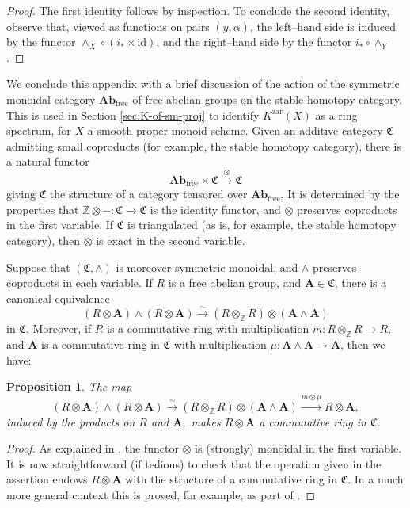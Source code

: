 \documentclass[12pt]{amsart}
\def\Kzar{K^{\mathrm{zar}}}
\newcommand{\Z}{\mathbb{Z}}
\numberwithin{equation}{section}
\theoremstyle{plain}
\newtheorem{prop}[equation]{Proposition}
\theoremstyle{definition}
\theoremstyle{remark}
\begin{document}
\begin{proof}
The first identity follows by inspection. To conclude the second
identity, observe that, viewed as functions on pairs $(y,\alpha)$, the
left--hand side is induced by the functor $\wedge_X\circ
(i_*\times\mathrm{id})$, and the right--hand side by the functor $i_*
\circ \wedge_Y$.
\end{proof}

We conclude this appendix with a brief discussion of the action of the
symmetric monoidal category $\mathbf{Ab}_{\mathrm{free}}$ of free abelian groups on the stable
homotopy category. This is used in Section \ref{sec:K-of-sm-proj} to identify
$\Kzar(X)$ as a ring spectrum, for $X$ a smooth proper monoid
scheme. Given an additive category
$\mathfrak{C}$ admitting small coproducts (for example, the stable
homotopy category), there is a natural functor
\[
\mathbf{Ab}_{\mathrm{free}}\times \mathfrak{C}
\xrightarrow{\otimes} \mathfrak{C}
\]
 giving $\mathfrak{C}$ the structure of a category tensored over
 $\mathbf{Ab}_{\mathrm{free}}$. It is determined by the properties
 that $\Z\otimes -: \mathfrak{C}\to\mathfrak{C}$ is the identity
 functor, and $\otimes$ preserves coproducts in the first variable. If
 $\mathfrak{C}$ is triangulated (as is, for example, the stable
 homotopy category), then $\otimes$ is exact in the second variable.
 
Suppose that $(\mathfrak{C},\wedge)$ is moreover symmetric monoidal,
 and $\wedge$ preserves coproducts in each variable. If $R$ is a free
 abelian group, and $\mathbf{A}\in \mathfrak{C}$, there is a canonical
 equivalence
 \[
 (R\otimes\mathbf{A})\wedge (R\otimes\mathbf{A})\xrightarrow{\sim} (R\otimes_\Z R)\otimes (\mathbf{A}\wedge\mathbf{A})
 \]
in $\mathfrak{C}$. Moreover, if $R$ is a commutative ring with
multiplication $m:R\otimes_\Z R\to R$, and $\mathbf{A}$ is a
commutative ring in $\mathfrak{C}$ with multiplication
$\mu:\mathbf{A}\wedge\mathbf{A}\to\mathbf{A}$, then we have:
 
 \begin{prop}\label{prop:algebras}
 	 The map
 	\[ (R\otimes\mathbf{A})\wedge (R\otimes\mathbf{A})\xrightarrow{\sim} (R\otimes_\Z R)\otimes (\mathbf{A}\wedge\mathbf{A})\xrightarrow{m\otimes\mu} R\otimes\mathbf{A},\]
 	induced by the products on $R$ and $\mathbf{A},$
 	makes $R\otimes\mathbf{A}$ a commutative ring in $\mathfrak{C}$.
 \end{prop}
 
\begin{proof}
As explained in \cite[Sec.\,6]{Pa}, the functor $\otimes$ is
(strongly) monoidal in the first variable. It is now straightforward
(if tedious) to check that the operation given in the assertion endows
$R\otimes \mathbf{A}$ with the structure of a commutative ring in
$\mathfrak{C}$. In a much more general context this is proved, for
example, as part of \cite[Cor.\,3.6]{Sch}.
 \end{proof}
 
\end{document}
